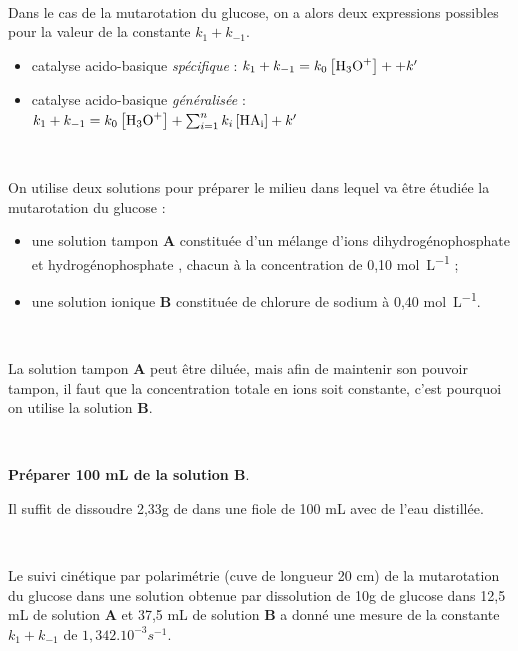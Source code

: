 \documentclass[twoside,a4paper,11pt,answers]{exam}
\begin{document}
\begin{questions}
~

\par Dans le cas de la mutarotation du glucose, on a alors deux expressions possibles pour la valeur de la constante $k_1 + k_{-1}$.
\begin{itemize}
    \item catalyse acido-basique \emph{spécifique} : $k_1 + k_{-1} = k_0\con{\ce{H3O+}} +  + k'$
    \item catalyse acido-basique \emph{généralisée}  : $k_1 + k_{-1} = k_0\con{\ce{H3O+}} + \sum_{i=1}^{n} k_i \con{HA_i} + k'$
\end{itemize}

~

\par On utilise deux solutions pour préparer le milieu dans lequel va être étudiée la mutarotation du glucose :
\begin{itemize}
    \item une solution tampon \textbf{A} constituée d'un mélange d'ions dihydrogénophosphate  et hydrogénophosphate , chacun à la concentration de 0,10 \unit{\mol.\liter^{-1}} ;
    \item une solution ionique \textbf{B} constituée de chlorure de sodium  à 0,40 \unit{\mol.\liter^{-1}}.
\end{itemize} 

~

\par La solution tampon \textbf{A} peut être diluée, mais afin de maintenir son pouvoir tampon, il faut que la concentration totale en ions soit constante, c'est pourquoi on utilise la solution \textbf{B}.

~

\par \textbf{Préparer 100 mL de la solution B}.
\begin{solution}
    Il suffit de dissoudre 2,33g de  dans une fiole de 100 mL avec de l'eau distillée.
\end{solution}

~





\par Le suivi cinétique par polarimétrie (cuve de longueur 20 cm) de la mutarotation du glucose dans une solution obtenue par dissolution de 10g de glucose dans 12,5 mL de solution \textbf{A} et 37,5 mL de solution \textbf{B} a donné une mesure de la constante $k_1 + k_{-1}$ de $1,342.10^{-3} \unit{s^{-1}}$.




\end{questions}
\end{document}
